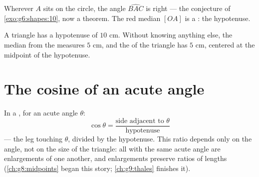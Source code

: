 \begin{omfigure}

{\small Wherever $A$ sits on the circle, the angle $\widehat{BAC}$ is
right --- the conjecture of \cref{exo:g6:shapes:10}, now a theorem.
The red median $[OA]$ is a :  the hypotenuse.}
\end{omfigure}

\begin{example}\label{ex:g8:cosine:circle}
A triangle has a hypotenuse of $10$ cm. Without knowing anything
else, the median from the  measures $5$ cm, and the
 of the triangle has  $5$ cm, centered at
the midpoint of the hypotenuse.
\end{example}

\section{The cosine of an acute angle}

\begin{definition}[Cosine]\label{def:g8:cosine:def}
In a , for an acute angle $\theta$:
\[
\cos\theta = \frac{\text{side adjacent to } \theta}{\text{hypotenuse}}
\]
--- the leg touching $\theta$, divided by the hypotenuse. This ratio
depends only on the angle, not on the size of the triangle: all  with the same acute angle are enlargements of one another,
and enlargements preserve ratios of lengths
(\cref{ch:g8:midpoints} began this story; \cref{ch:g9:thales}
finishes it).
\end{definition}

